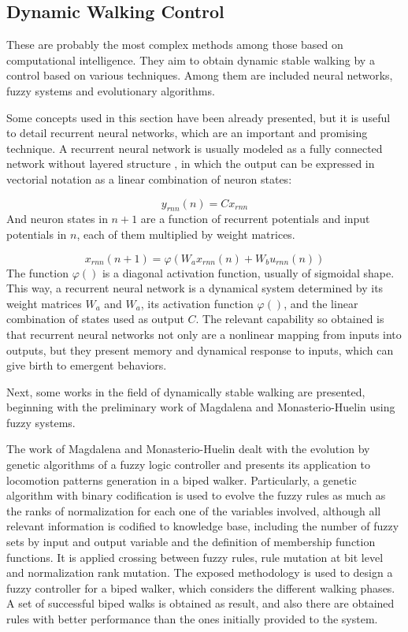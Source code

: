 \subsection{Dynamic Walking Control}
These are probably the most complex methods among those based on
computational intelligence. They aim to obtain dynamic stable walking
by a control based on various techniques. Among them are included
neural networks, fuzzy systems and evolutionary algorithms.


Some concepts used in this section have been already presented, but it
is useful to detail recurrent neural networks, which are an important
and promising technique. A recurrent neural network is usually modeled
as a fully connected network without layered structure
\cite{Haykin98Neural}, in which the output can be expressed in
vectorial notation as a linear combination of neuron states:

\begin{equation}
  y_{rnn}(n)=C x_{rnn}
\end{equation}
\newline And neuron states in $n+1$ are a function of recurrent
potentials and input potentials in $n$, each of them multiplied by
weight matrices.

\begin{equation}
  x_{rnn}(n+1)=\varphi(W_a x_{rnn}(n)+W_b u_{rnn}(n))
\end{equation}
\newline The function $\varphi()$ is a diagonal activation function,
usually of sigmoidal shape. This way, a recurrent neural network is a
dynamical system determined by its weight matrices $W_a$ and $W_a$,
its activation function $\varphi()$, and the linear combination of
states used as output $C$. The relevant capability so obtained is that
recurrent neural networks not only are a nonlinear mapping from inputs
into outputs, but they present memory and dynamical response to
inputs, which can give birth to emergent behaviors.


Next, some works in the field of dynamically stable walking are
presented, beginning with the preliminary work of Magdalena and
Monasterio-Huelin using fuzzy systems.


The work of Magdalena and Monasterio-Huelin \cite{Magdalena97fuzzy}
dealt with the evolution by genetic algorithms of a fuzzy logic
controller and presents its application to locomotion patterns
generation in a biped walker. Particularly, a genetic algorithm with
binary codification is used to evolve the fuzzy rules as much as the
ranks of normalization for each one of the variables involved,
although all relevant information is codified to knowledge base,
including the number of fuzzy sets by input and output variable and
the definition of membership function functions. It is applied
crossing between fuzzy rules, rule mutation at bit level and
normalization rank mutation. The exposed methodology is used to design
a fuzzy controller for a biped walker, which considers the different
walking phases. A set of successful biped walks is obtained as result,
and also there are obtained rules with better performance than the
ones initially provided to the system.


